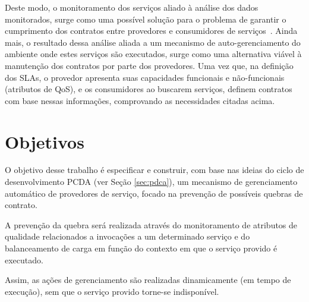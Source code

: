 Deste modo, o monitoramento dos serviços aliado à análise dos dados monitorados, surge como uma possível solução para o problema de garantir o cumprimento dos contratos entre provedores e consumidores de serviços~\cite{papazoglou2008service}. Ainda mais, o resultado dessa análise aliada a um mecanismo de auto-gerenciamento do ambiente onde estes serviços são executados, surge como uma alternativa viável à manutenção dos contratos por parte dos provedores. Uma vez que, na definição dos SLAs, o provedor apresenta suas capacidades funcionais e não-funcionais (atributos de QoS), e os consumidores ao buscarem serviços, definem contratos com base nessas informações, comprovando as necessidades citadas acima.

\section{Objetivos}
\label{sec:obj}

O objetivo desse trabalho é especificar e construir, com base nas ideias do ciclo de desenvolvimento PCDA (ver Seção \ref{sec:pdca}), um mecanismo de gerenciamento automático de provedores de serviço, focado na prevenção de possíveis quebras de contrato.

A prevenção da quebra será realizada através do monitoramento de atributos de qualidade relacionados a invocações a um determinado serviço e do balanceamento de carga em função do contexto em que o serviço provido é executado. 

Assim, as ações de gerenciamento são realizadas dinamicamente (em tempo de execução), sem que o serviço provido torne-se indisponível.



